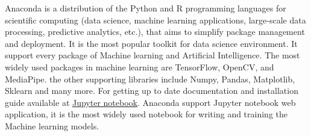 Anaconda is a distribution of the Python and R programming languages for scientific computing (data science, machine learning applications, large-scale data processing, predictive analytics, etc.), that aims to simplify package management and deployment. It is the most popular toolkit for data science environment. It support every package of Machine learning and Artificial Intelligence. The most widely used packages in machine learning are TensorFlow, OpenCV, and MediaPipe. the other supporting libraries include Numpy, Pandas, Matplotlib, Sklearn and many more. For getting up to date documentation and installation guide available at \href{https://www.anaconda.com/products/individual}{Jupyter notebook}. Anaconda support Jupyter notebook web application, it is the most widely used notebook for writing and training the Machine learning models.




